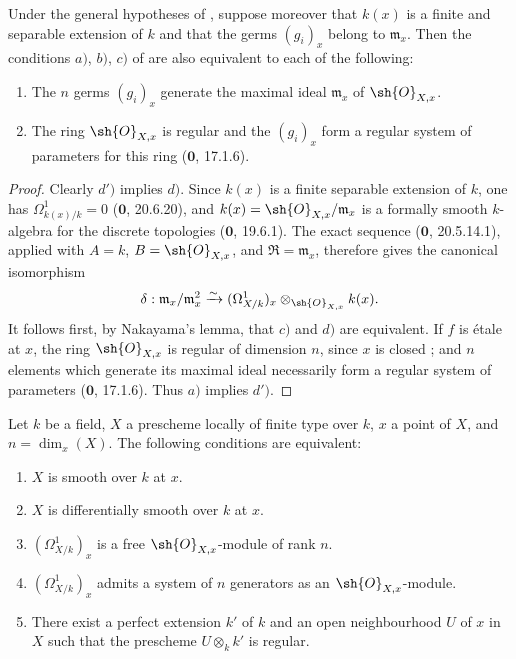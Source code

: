 \begin{corollary}[17.15.4]
\label{IV.17.15.4}
Under the general hypotheses of , suppose moreover that $k(x)$ is a finite and separable extension of $k$ and that the germs $(g_i)_x$ belong to $\mathfrak{m}_x$.
Then the conditions $a)$, $b)$, $c)$ of  are also equivalent to each of the following:
\begin{enumerate}
  \item[d)] The $n$ germs $(g_i)_x$ generate the maximal ideal $\mathfrak m_x$ of $\sh{O}_{X,x}$.
  \item[d')] The ring $\sh{O}_{X,x}$ is regular and the $(g_i)_x$ form a regular system of parameters for this ring ($\mathbf{0}$, 17.1.6).
\end{enumerate}
\end{corollary}

\begin{proof}
Clearly $d')$ implies $d)$.
Since $k(x)$ is a finite separable extension of $k$, one has $\Omega^1_{k(x)/k}=0$ ($\mathbf{0}$, 20.6.20), and $k(x)=\sh{O}_{X,x}/\mathfrak m_x$ is a formally smooth $k$-algebra for the discrete topologies ($\mathbf{0}$, 19.6.1).  The exact sequence ($\mathbf{0}$, 20.5.14.1), applied with $A=k$, $B=\sh{O}_{X,x}$, and $\mathfrak R=\mathfrak m_x$, therefore gives the canonical isomorphism
\[
\delta:\mathfrak m_x/\mathfrak m_x^2\xrightarrow{\sim} (\Omega^1_{X/k})_x\otimes_{\sh{O}_{X,x}} k(x).
\]
It follows first, by Nakayama's lemma, that $c)$ and $d)$ are equivalent.
If $f$ is \'etale at $x$, the ring $\sh{O}_{X,x}$ is regular of dimension $n$, since $x$ is closed ; and $n$ elements which generate its maximal ideal necessarily form a regular system of parameters ($\mathbf{0}$, 17.1.6).  Thus $a)$ implies $d')$.
\end{proof}

\begin{proposition}[17.15.5]
\label{IV.17.15.5}
Let $k$ be a field, $X$ a prescheme locally of finite type over $k$, $x$ a point of $X$, and $n=\dim_x(X)$.
The following conditions are equivalent:
\begin{enumerate}
  \item[a)] $X$ is smooth over $k$ at $x$.
  \item[b)] $X$ is differentially smooth over $k$ at $x$.
  \item[c)] $(\Omega^1_{X/k})_x$ is a free $\sh{O}_{X,x}$-module of rank $n$.
  \item[d)] $(\Omega^1_{X/k})_x$ admits a system of $n$ generators as an $\sh{O}_{X,x}$-module.
  \item[e)] There exist a perfect extension $k'$ of $k$ and an open neighbourhood $U$ of $x$ in $X$ such that the prescheme $U\otimes_k k'$ is regular.
\end{enumerate}
\end{proposition}

